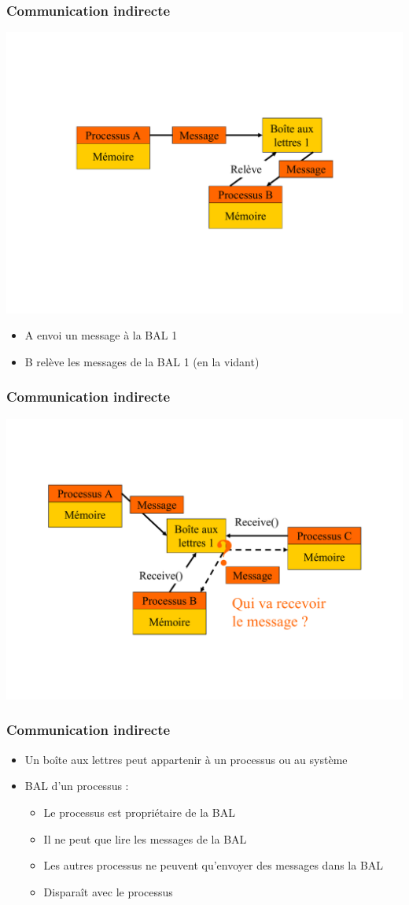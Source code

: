 \begin{frame}
\frametitle{Communication indirecte}
\includegraphics[width=.9\textwidth]{../illustration/comm_indirecte.pdf}
\begin{itemize}
\item A envoi un message à la BAL 1
\item B relève les messages de la BAL 1 (en la vidant)
\end{itemize}
\end{frame}

\begin{frame}
\frametitle{Communication indirecte}
\includegraphics[width=.9\textwidth]{../illustration/comm_indirecte_question.pdf}
\end{frame}

\begin{frame}
\frametitle{Communication indirecte}
\begin{itemize}
\item Un boîte aux lettres peut appartenir à un processus ou au système
\item BAL d’un processus :
\begin{itemize}
\item Le processus est propriétaire de la BAL
\item Il ne peut que lire les messages de la BAL
\item Les autres processus ne peuvent qu’envoyer des messages dans la BAL
\item Disparaît avec le processus
\end{itemize}
\end{itemize}
\end{frame}

